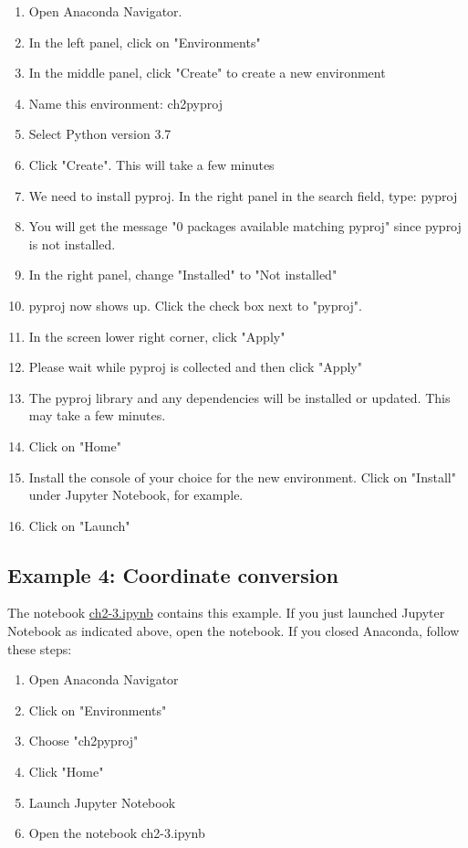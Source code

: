 \documentclass[a4paper , 12pt]{book}
\begin{document}
\begin{enumerate}
    \item Open Anaconda Navigator.
    \item In the left panel, click on "Environments"
    \item In the middle panel, click "Create" to create a new environment
    \item Name this environment: ch2pyproj
    \item Select Python version 3.7
    \item Click "Create". This will take a few minutes
    \item We need to install pyproj. In the right panel in the search field, type: pyproj
    \item You will get the message "0 packages available matching pyproj" since pyproj is not installed. 
    \item In the right panel, change "Installed" to "Not installed"
    \item pyproj now shows up. Click the check box next to "pyproj".
    \item In the screen lower right corner, click "Apply"
    \item Please wait while pyproj is collected and then click "Apply"
    \item The pyproj library and any dependencies will be installed or updated. This may take a few minutes.
    \item Click on "Home"
    \item Install the console of your choice for the new environment. Click on "Install" under Jupyter Notebook, for example.
    \item Click on "Launch"
\end{enumerate}

\subsection*{Example 4: Coordinate conversion}

The notebook \href{http://github.com}{ch2-3.ipynb} contains this example. If you just launched Jupyter Notebook as indicated above, open the notebook. If you closed Anaconda, follow these steps:

\begin{enumerate}
    \item Open Anaconda Navigator
    \item Click on "Environments"
    \item Choose "ch2pyproj"
    \item Click "Home"
    \item Launch Jupyter Notebook
    \item Open the notebook ch2-3.ipynb
\end{enumerate}{}
\end{document}

